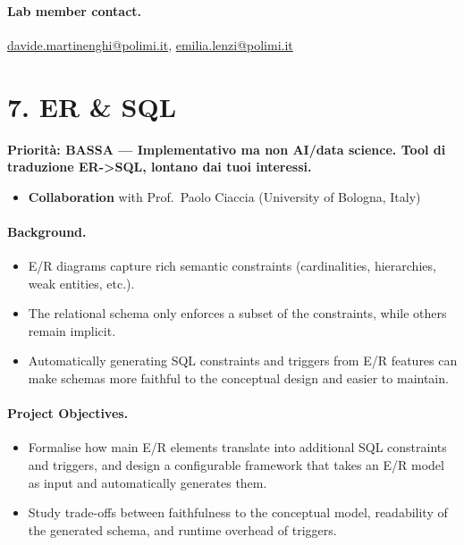 \documentclass[a4paper,11pt]{article}
\newcommand{\priorita}[1]{%
  \par\smallskip\noindent\textbf{Priorit\`a: #1}\par\smallskip
}
\begin{document}
\paragraph{Lab member contact.}
\url{davide.martinenghi@polimi.it}, \url{emilia.lenzi@polimi.it}


\section{7. ER \& SQL}

\priorita{BASSA --- Implementativo ma non AI/data science. Tool di traduzione ER->SQL, lontano dai tuoi interessi.}

\begin{itemize}[nosep]
  \item \textbf{Collaboration} with Prof.\ Paolo Ciaccia (University of Bologna, Italy)
\end{itemize}

\paragraph{Background.}
\begin{itemize}[nosep]
  \item E/R diagrams capture rich semantic constraints (cardinalities, hierarchies, weak entities, etc.).
  \item The relational schema only enforces a subset of the constraints, while others remain implicit.
  \item Automatically generating SQL constraints and triggers from E/R features can make schemas more faithful to the conceptual design and easier to maintain.
\end{itemize}

\paragraph{Project Objectives.}
\begin{itemize}[nosep]
  \item Formalise how main E/R elements translate into additional SQL constraints and triggers, and design a configurable framework that takes an E/R model as input and automatically generates them.
  \item Study trade-offs between faithfulness to the conceptual model, readability of the generated schema, and runtime overhead of triggers.
\end{itemize}
\end{document}
